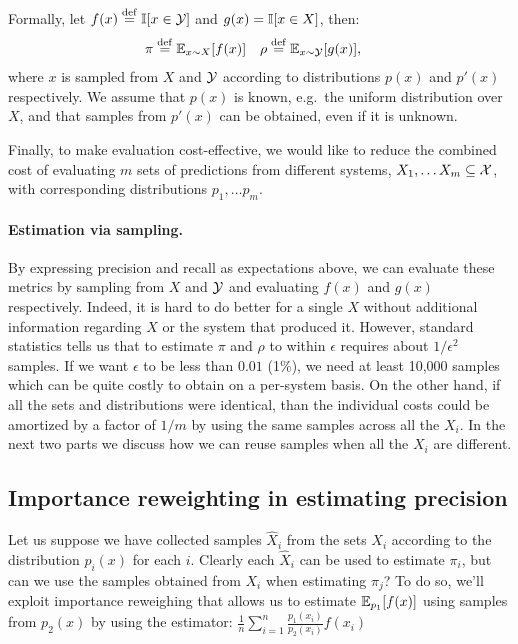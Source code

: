 Formally, let $f(x) \stackrel{\rm def}{=} \mathbb{I}[x \in \mathcal{Y}]$ and $g(x) = \mathbb{I}[x \in X]$, then:
\begin{align*}
  \pi  &\stackrel{\rm def}{=} \mathbb{E}_{x \sim X}[f(x)] &
  \rho &\stackrel{\rm def}{=} \mathbb{E}_{x \sim \mathcal{Y}}[g(x)],
\end{align*}
where $x$ is sampled from $X$ and $\mathcal{Y}$ according to distributions $p(x)$ and $p'(x)$ respectively.
We assume that $p(x)$ is known, e.g.\ the uniform distribution over $X$, and that samples from $p'(x)$ can be obtained, even if it is unknown.

Finally, to make evaluation cost-effective, we would like to reduce the combined cost of evaluating $m$ sets of predictions from different systems, $X_1, \ldots X_m \subseteq \mathcal{X}$, with corresponding distributions $p_1, \ldots p_m$.

\paragraph{Estimation via sampling.}

By expressing precision and recall as expectations above, we can evaluate these metrics by sampling from $X$ and $\mathcal{Y}$ and evaluating $f(x)$ and $g(x)$ respectively.
Indeed, it is hard to do better for a single $X$ without additional information regarding $X$ or the system that produced it.
However, standard statistics tells us that to estimate $\pi$ and $\rho$ to within $\epsilon$ requires about $1/\epsilon^2$ samples.
If we want $\epsilon$ to be less than $0.01$ (1\%), we need at least 10,000 samples which can be quite costly to obtain on a per-system basis.
On the other hand, if all the sets and distributions were identical, than the individual costs could be amortized by a factor of $1/m$ by using the same samples across all the $X_i$.
In the next two parts we discuss how we can reuse samples when all the $X_i$ are different.

\subsection{Importance reweighting in estimating precision}
\newcommand{\Xh}{{\hat{X}}}
\newcommand{\fh}{{\hat{f}}}
\newcommand{\muh}{{\hat{\mu}}}

Let us suppose we have collected samples $\Xh_i$ from the sets $X_i$ according to the distribution $p_i(x)$ for each $i$.
Clearly each $\Xh_i$ can be used to estimate $\pi_i$, but can we use the samples obtained from $X_i$ when estimating $\pi_j$?
To do so, we'll exploit importance reweighing that allows us to estimate $\mathbb{E}_{p_1}[f(x)]$ using samples from $p_2(x)$ by using the estimator: $\frac{1}{n}\sum_{i=1}^n \frac{p_1(x_i)}{p_2(x_i)} f(x_i)$ 


